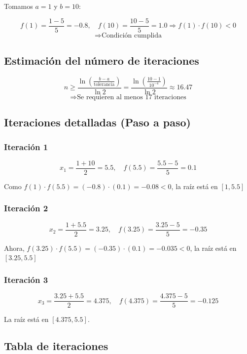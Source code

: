 \documentclass[12pt]{article}
\begin{document}
Tomamos $a = 1$ y $b = 10$:

\[
f(1) = \frac{1-5}{5} = -0.8, \quad f(10) = \frac{10-5}{5} = 1.0 \Rightarrow f(1) \cdot f(10) < 0
\]
\[
\Rightarrow \text{Condición cumplida}
\]

\subsection*{Estimación del número de iteraciones}

\[
n \geq \frac{\ln \left(\frac{b - a}{\text{tolerancia}}\right)}{\ln 2} = \frac{\ln \left(\frac{10 - 1}{10^{-4}}\right)}{\ln 2} \approx 16.47
\]
\[
\Rightarrow \text{Se requieren al menos 17 iteraciones}
\]

\subsection*{Iteraciones detalladas (Paso a paso)}

\subsubsection*{Iteración 1}

\[
x_1 = \frac{1 + 10}{2} = 5.5, \quad f(5.5) = \frac{5.5 - 5}{5} = 0.1
\]

Como $f(1) \cdot f(5.5) = (-0.8) \cdot (0.1) = -0.08 < 0$, la raíz está en $[1, 5.5]$

\subsubsection*{Iteración 2}

\[
x_2 = \frac{1 + 5.5}{2} = 3.25, \quad f(3.25) = \frac{3.25 - 5}{5} = -0.35
\]

Ahora, $f(3.25) \cdot f(5.5) = (-0.35) \cdot (0.1) = -0.035 < 0$, la raíz está en $[3.25, 5.5]$

\subsubsection*{Iteración 3}

\[
x_3 = \frac{3.25 + 5.5}{2} = 4.375, \quad f(4.375) = \frac{4.375 - 5}{5} = -0.125
\]

La raíz está en $[4.375, 5.5]$.

\subsection*{Tabla de iteraciones}
\end{document}
